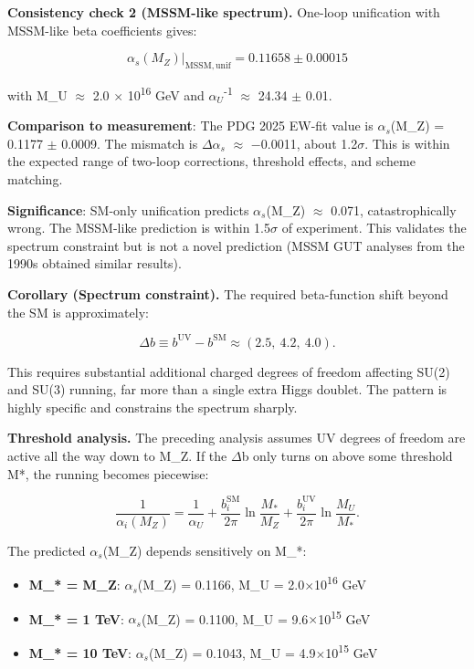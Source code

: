 \documentclass[11pt,a4paper]{article}
\theoremstyle{remark}
\providecommand{\tightlist}{%
  \setlength{\itemsep}{0pt}\setlength{\parskip}{0pt}}
\begin{document}
\textbf{Consistency check 2 (MSSM-like spectrum).} One-loop unification with MSSM-like
beta coefficients gives:

\[
\alpha_s(M_Z)|_\mathrm{MSSM,unif} = 0.11658 \pm 0.00015
\]

with M\_U \ensuremath{\approx} 2.0 \ensuremath{\times} 10\textsuperscript{16} GeV and $\alpha_U$\textsuperscript{-1} \ensuremath{\approx} 24.34 \ensuremath{\pm} 0.01.

\textbf{Comparison to measurement}: The PDG 2025 EW-fit value is
$\alpha_s$(M\_Z) = 0.1177 \ensuremath{\pm} 0.0009. The mismatch is
\ensuremath{\Delta}$\alpha_s$ \ensuremath{\approx} \ensuremath{-}0.0011, about 1.2\ensuremath{\sigma}. This is within the
expected range of two-loop corrections, threshold effects, and scheme
matching.

\textbf{Significance}: SM-only unification predicts $\alpha_s$(M\_Z) \ensuremath{\approx} 0.071,
catastrophically wrong. The MSSM-like prediction is within 1.5\ensuremath{\sigma} of
experiment. This validates the spectrum constraint but is not a novel
prediction (MSSM GUT analyses from the 1990s obtained similar results).

\textbf{Corollary (Spectrum constraint).} The required beta-function shift beyond
the SM is approximately:

\[
\Delta b \equiv b^{\mathrm{UV}} - b^{\mathrm{SM}} \approx (2.5,\ 4.2,\ 4.0).
\]

This requires substantial additional charged degrees of freedom affecting
SU(2) and SU(3) running, far more than a single extra Higgs doublet.
The pattern is highly specific and constrains the spectrum sharply.

\textbf{Threshold analysis.} The preceding analysis assumes UV degrees of freedom
are active all the way down to M\_Z. If the \ensuremath{\Delta}b only turns on above
some threshold M*, the running becomes piecewise:

\[
\frac{1}{\alpha_i(M_Z)} = \frac{1}{\alpha_U} + \frac{b_i^\mathrm{SM}}{2\pi}
\ln\frac{M_\ast}{M_Z} + \frac{b_i^\mathrm{UV}}{2\pi}\ln\frac{M_U}{M_\ast}.
\]

The predicted $\alpha_s$(M\_Z) depends sensitively on M\_*:

\begin{itemize}
\tightlist
\item
  \textbf{M\_* = M\_Z}: $\alpha_s$(M\_Z) = 0.1166, M\_U = 2.0\ensuremath{\times}10\textsuperscript{16} GeV
\item
  \textbf{M\_* = 1 TeV}: $\alpha_s$(M\_Z) = 0.1100, M\_U = 9.6\ensuremath{\times}10\textsuperscript{15} GeV
\item
  \textbf{M\_* = 10 TeV}: $\alpha_s$(M\_Z) = 0.1043, M\_U = 4.9\ensuremath{\times}10\textsuperscript{15} GeV
\end{itemize}
\end{document}
